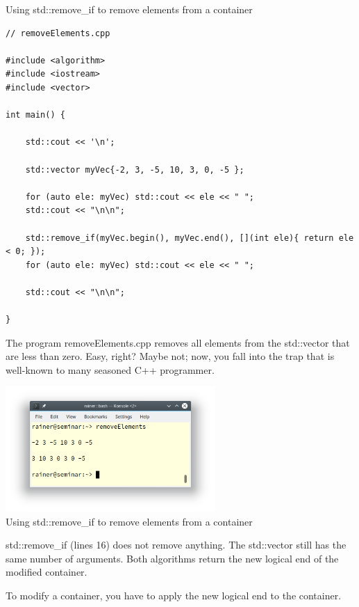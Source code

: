 \noindent
Using std::remove\_if to remove elements from a container
\begin{lstlisting}[style=styleCXX]
// removeElements.cpp

#include <algorithm>
#include <iostream>
#include <vector>

int main() {

	std::cout << '\n';
	
	std::vector myVec{-2, 3, -5, 10, 3, 0, -5 };
	
	for (auto ele: myVec) std::cout << ele << " ";
	std::cout << "\n\n";
	
	std::remove_if(myVec.begin(), myVec.end(), [](int ele){ return ele < 0; });
	for (auto ele: myVec) std::cout << ele << " ";
	
	std::cout << "\n\n";

}
\end{lstlisting}

The program removeElements.cpp removes all elements from the std::vector that are less than zero. Easy, right? Maybe not; now, you fall into the trap that is well-known to many seasoned C++ programmer.

\begin{center}
\includegraphics[width=0.6\textwidth]{content/3/chapter5/images/11.png}\\
Using std::remove\_if to remove elements from a container
\end{center}

std::remove\_if (lines 16) does not remove anything. The std::vector still has the same number of arguments. Both algorithms return the new logical end of the modified container.

To modify a container, you have to apply the new logical end to the container.

